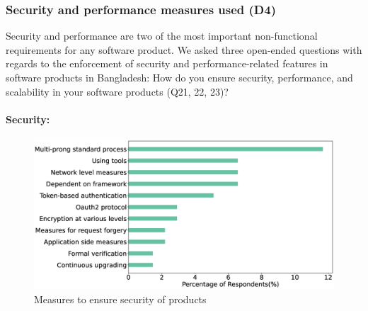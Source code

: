 \subsubsection{Security and performance measures used (D4)}
\label{security_performance}
Security and performance are two of the most important non-functional requirements for any software product. 
We asked three open-ended questions with regards to the enforcement of security and performance-related features in software products in Bangladesh:
How do you ensure security, performance, and scalability in your software products (Q21, 22, 23)?



\paragraph{Security:}
\label{Security}

\begin{figure}[h]
\centering
\includegraphics[scale=0.22]{Figures/Security.eps} 
\caption{Measures to ensure security of products}
\label{fig:Measures to ensure security}
\end{figure}


